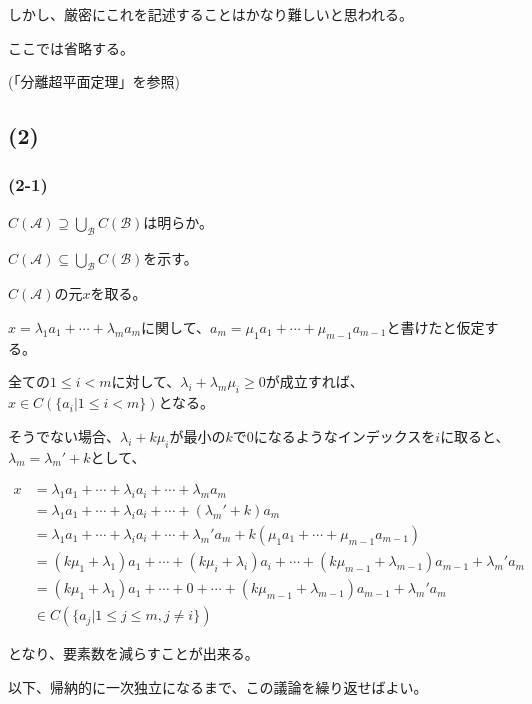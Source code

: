 \documentclass[a4paper, 10pt, dvipdfmx]{jlreq}
\begin{document}
しかし、厳密にこれを記述することはかなり難しいと思われる。

ここでは省略する。

(「分離超平面定理」を参照)

\subsection*{(2)}

\subsubsection*{(2-1)}

$C(\mathcal{A}) \supseteq \bigcup_{\mathcal{B}}C(\mathcal{B})$は明らか。

$C(\mathcal{A}) \subseteq \bigcup_{\mathcal{B}}C(\mathcal{B})$を示す。

$C(\mathcal{A})$の元$x$を取る。

$x=\lambda_1 a_1+ \cdots + \lambda_m a_m$に関して、$a_m=\mu_1 a_1 + \cdots + \mu_{m-1} a_{m-1}$と書けたと仮定する。

全ての$1 \leq i < m$に対して、$\lambda_i+\lambda_m \mu_i \geq 0$が成立すれば、$x \in C(\{a_i | 1 \leq i < m \})$となる。

そうでない場合、$\lambda_i+k \mu_i$が最小の$k$で0になるようなインデックスを$i$に取ると、$\lambda_m=\lambda_m'+k$として、

\begin{align*}
    x & =\lambda_1 a_1 + \cdots + \lambda_i a_i + \cdots + \lambda_m a_m                                                       \\
      & =\lambda_1 a_1 + \cdots + \lambda_i a_i + \cdots +(\lambda_m'+k) a_m                                                   \\
      & =\lambda_1 a_1 + \cdots + \lambda_i a_i + \cdots + \lambda_m' a_m + k(\mu_1a_1+\cdots+\mu_{m-1}a_{m-1})                \\
      & =(k\mu_1+\lambda_1) a_1 + \cdots + (k\mu_i+\lambda_i)a_i + \cdots + (k \mu_{m-1}+\lambda_{m-1}) a_{m-1}+\lambda_m' a_m \\
      & =(k\mu_1+\lambda_1) a_1 + \cdots + 0 + \cdots + (k \mu_{m-1}+\lambda_{m-1}) a_{m-1}+\lambda_m' a_m                     \\
      & \in C(\{a_j | 1 \leq j \leq m, j\neq i \})
\end{align*}

となり、要素数を減らすことが出来る。

以下、帰納的に一次独立になるまで、この議論を繰り返せばよい。
\end{document}
